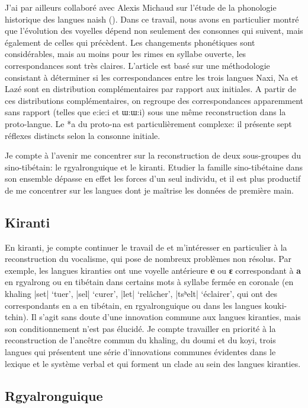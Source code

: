 \documentclass[oldfontcommands,oneside,a4paper,11pt]{memoir}
\newcommand{\ipa}[1]{{\phon\textbf{#1}}}
\begin{document}
J'ai par ailleurs collaboré avec Alexis Michaud sur l'étude de la phonologie historique des langues naish (\citealt{jacques.michaud11naish}). Dans ce travail, nous avons en particulier montré que l'évolution des voyelles dépend non seulement des consonnes qui suivent, mais également de celles qui précèdent. Les changements phonétiques sont considérables, mais au moins pour les rimes en syllabe ouverte, les correspondances sont très claires. L'article est basé sur une méthodologie consistant à déterminer si les correspondances entre les trois langues Naxi, Na et Lazé sont en distribution complémentaires par rapport aux initiales. A partir de ces distributions complémentaires, on regroupe des correspondances apparemment sans rapport (telles que e:ie:i et ɯ:ɯ:i) sous une même reconstruction dans la proto-langue. Le *a du proto-na est particulièrement complexe: il présente sept réflexes distincts selon la consonne initiale. 

Je compte à l'avenir me concentrer sur la reconstruction de deux sous-groupes du sino-tibétain: le rgyalronguique et le kiranti. Etudier la famille sino-tibétaine dans son ensemble dépasse en effet les forces d'un seul individu, et il est plus productif de me concentrer sur les langues dont je maîtrise les données de première main. 

\subsection{Kiranti}

En kiranti, je compte continuer le travail de \citet{michailovsky94stops} et m'intéresser en particulier à la reconstruction du vocalisme, qui pose de nombreux problèmes non résolus. Par exemple, les langues kiranties ont une voyelle antérieure \ipa{e} ou \ipa{ɛ} correspondant  à \ipa{a} en rgyalrong ou en tibétain dans certains mots à syllabe fermée en coronale (en khaling |set| `tuer', |sel| `curer', |let| `relâcher', |tsʰelt|  `éclairer', qui ont des correspondants en a en tibétain, en rgyalronguique ou dans les langues kouki-tchin). Il s'agit sans doute d'une innovation commune aux langues kiranties, mais son conditionnement n'est pas élucidé. Je compte travailler en priorité à la reconstruction de l'ancêtre commun du khaling, du doumi et du koyi, trois langues qui présentent une série d'innovations communes évidentes dans le lexique et le système verbal et qui forment un clade au sein des langues kiranties.

\subsection{Rgyalronguique}
\end{document}
